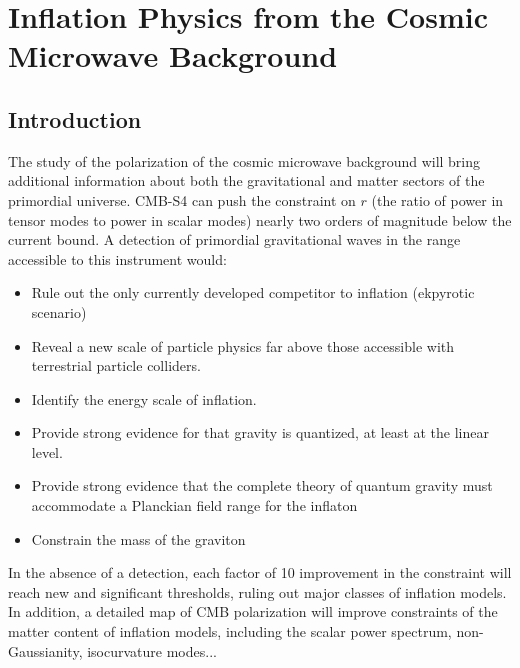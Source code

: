  
\chapter{Inflation Physics from the Cosmic Microwave Background}
\renewcommand*\thesection{\arabic{section}}


\def\gtrsim{\raise-.75ex\hbox{$\buildrel>\over\sim$}}

\section{Introduction}
The study of the polarization of the cosmic microwave background will bring additional information about both the gravitational and matter sectors of the primordial universe.  CMB-S4 can push the constraint on $r$ (the ratio of power in tensor modes to power in scalar modes) nearly two orders of magnitude below the current bound. A detection of primordial gravitational waves in the range accessible to this instrument would:
\begin{itemize}
\item  Rule out the only currently developed competitor to inflation (ekpyrotic scenario)
 \item Reveal a new scale of particle physics far above those accessible with terrestrial particle colliders. 
 \item Identify the energy scale of inflation. 
\item  Provide strong evidence for that gravity is quantized, at least at the linear level.
\item	 Provide strong evidence that the complete theory of quantum gravity must accommodate a Planckian field range for the inflaton
\item  Constrain the mass of the graviton 
\end{itemize}
In the absence of a detection, each factor of 10 improvement in the constraint will reach new and significant thresholds, ruling out major classes of inflation models. In addition, a detailed map of CMB polarization will improve constraints of the matter content of inflation models, including the scalar power spectrum, non-Gaussianity, isocurvature modes...
 
